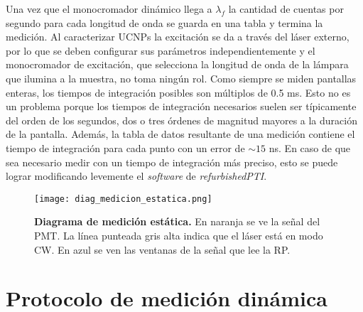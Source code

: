 \noindent Una vez que el monocromador dinámico llega a $\lambda_f$ la cantidad de cuentas por segundo para cada longitud de onda se guarda en una tabla y termina la medición.
Al caracterizar UCNPs la excitación se da a través del láser externo, por lo que se deben configurar sus parámetros independientemente y el monocromador de excitación, que selecciona la longitud de onda de la lámpara que ilumina a la muestra, no toma ningún rol.
Como siempre se miden pantallas enteras, los tiempos de integración posibles son múltiplos de 0.5 ms.
Esto no es un problema porque los tiempos de integración necesarios suelen ser típicamente del orden de los segundos, dos o tres órdenes de magnitud mayores a la duración de la pantalla.
Además, la tabla de datos resultante de una medición contiene el tiempo de integración para cada punto con un error de $\sim 15$ ns.
En caso de que sea necesario medir con un tiempo de integración más preciso, esto se puede lograr modificando levemente el \textit{software} de \textit{refurbishedPTI}.

\begin{SCfigure}
     \centering
     \texttt{[image: diag\_medicion\_estatica.png]}
     \caption{\textbf{Diagrama de medición estática.} En naranja se ve la señal del PMT. La línea punteada gris alta indica que el láser está en modo CW. En azul se ven las ventanas de la señal que lee la RP.}
     \label{fig:diag_medicion_estatica}
\end{SCfigure}


\section{Protocolo de medición dinámica} \label{sec:proceso_dinamico}

